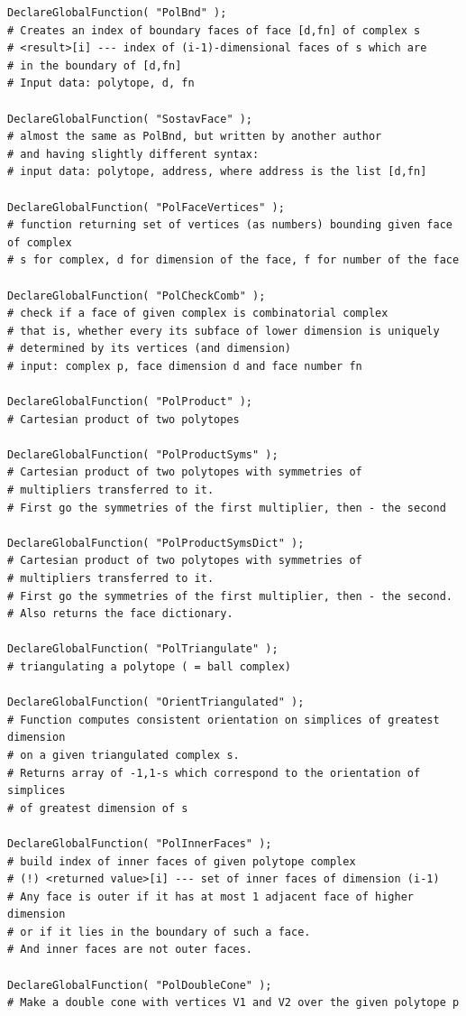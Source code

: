 \documentclass{article}
\begin{document}
\begin{verbatim}
DeclareGlobalFunction( "PolBnd" );
# Creates an index of boundary faces of face [d,fn] of complex s
# <result>[i] --- index of (i-1)-dimensional faces of s which are 
# in the boundary of [d,fn]
# Input data: polytope, d, fn

DeclareGlobalFunction( "SostavFace" );
# almost the same as PolBnd, but written by another author 
# and having slightly different syntax:
# input data: polytope, address, where address is the list [d,fn]

DeclareGlobalFunction( "PolFaceVertices" );
# function returning set of vertices (as numbers) bounding given face of complex
# s for complex, d for dimension of the face, f for number of the face

DeclareGlobalFunction( "PolCheckComb" );
# check if a face of given complex is combinatorial complex
# that is, whether every its subface of lower dimension is uniquely
# determined by its vertices (and dimension)
# input: complex p, face dimension d and face number fn

DeclareGlobalFunction( "PolProduct" );
# Cartesian product of two polytopes

DeclareGlobalFunction( "PolProductSyms" );
# Cartesian product of two polytopes with symmetries of 
# multipliers transferred to it.
# First go the symmetries of the first multiplier, then - the second

DeclareGlobalFunction( "PolProductSymsDict" );
# Cartesian product of two polytopes with symmetries of 
# multipliers transferred to it.
# First go the symmetries of the first multiplier, then - the second.
# Also returns the face dictionary.

DeclareGlobalFunction( "PolTriangulate" );
# triangulating a polytope ( = ball complex)

DeclareGlobalFunction( "OrientTriangulated" );
# Function computes consistent orientation on simplices of greatest dimension
# on a given triangulated complex s.
# Returns array of -1,1-s which correspond to the orientation of simplices 
# of greatest dimension of s

DeclareGlobalFunction( "PolInnerFaces" );
# build index of inner faces of given polytope complex
# (!) <returned value>[i] --- set of inner faces of dimension (i-1)
# Any face is outer if it has at most 1 adjacent face of higher dimension
# or if it lies in the boundary of such a face.
# And inner faces are not outer faces.

DeclareGlobalFunction( "PolDoubleCone" );
# Make a double cone with vertices V1 and V2 over the given polytope p


\end{verbatim}
\end{document}
